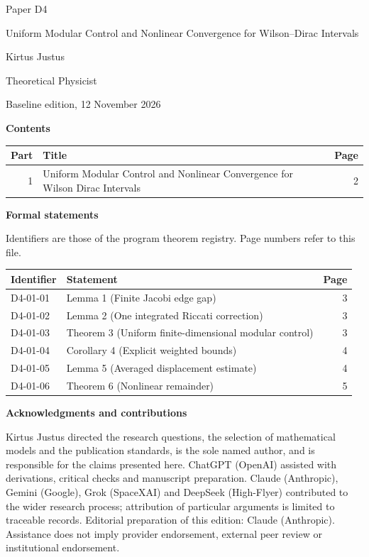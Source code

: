 \documentclass[11pt,a4paper]{article}
\begin{document}
\thispagestyle{empty}\pagestyle{empty}
{\small\sffamily \ProgramTitle\hfill Paper D4\par}
\vspace*{12mm}
{\LARGE\bfseries\raggedright{} Uniform Modular Control and Nonlinear Convergence for Wilson–Dirac Intervals\par}
\vspace{9mm}
{\large Kirtus Justus\par}\vspace{1mm}Theoretical Physicist\par\AuthorLocation\par\vspace{2mm}Baseline edition, 12 November 2026\par\vspace{8mm}
\textbf{Contents}\par\vspace{1mm}
{\small\begin{longtable}{@{}r>{\raggedright\arraybackslash}p{}r@{}}
\toprule Part & Title & Page\\\midrule\endhead
1 & Uniform Modular Control and Nonlinear Convergence for Wilson Dirac Intervals & 2\\
\bottomrule\end{longtable}}
\vspace{2mm}\textbf{Formal statements}\par\vspace{1mm}
{\footnotesize Identifiers are those of the program theorem registry. Page numbers refer to this file.\par}
{\footnotesize\begin{longtable}{@{}l>{\raggedright\arraybackslash}p{}r@{}}
\toprule Identifier & Statement & Page\\\midrule\endhead
D4-01-01 & Lemma 1 (Finite Jacobi edge gap) & 3\\
D4-01-02 & Lemma 2 (One integrated Riccati correction) & 3\\
D4-01-03 & Theorem 3 (Uniform finite-dimensional modular control) & 3\\
D4-01-04 & Corollary 4 (Explicit weighted bounds) & 4\\
D4-01-05 & Lemma 5 (Averaged displacement estimate) & 4\\
D4-01-06 & Theorem 6 (Nonlinear remainder) & 5\\
\bottomrule\end{longtable}}
\vspace{3mm}\textbf{Acknowledgments and contributions}\par
{\small Kirtus Justus directed the research questions, the selection of mathematical models and the publication standards, is the sole named author, and is responsible for the claims presented here. ChatGPT (OpenAI) assisted with derivations, critical checks and manuscript preparation. Claude (Anthropic), Gemini (Google), Grok (SpaceXAI) and DeepSeek (High-Flyer) contributed to the wider research process; attribution of particular arguments is limited to traceable records. Editorial preparation of this edition: Claude (Anthropic). Assistance does not imply provider endorsement, external peer review or institutional endorsement.\par}
\end{document}
